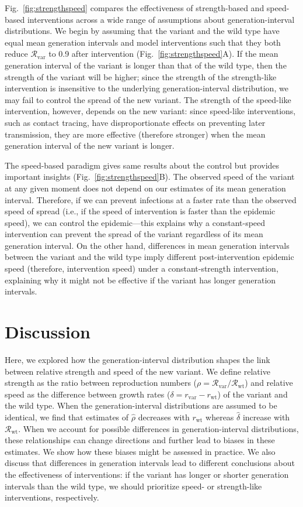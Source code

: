 \documentclass[12pt]{article}
\newcommand{\fref}[1]{Fig.~\ref{fig:#1}}
\newcommand{\vvvar}{\mathrm{var}}
\newcommand{\wwwt}{\mathrm{wt}}
\newcommand{\rx}[1]{\ensuremath{{r}_{#1}}\xspace}
\newcommand{\rw}{\rx{\wwwt}}
\newcommand{\rv}{\rx{\vvvar}}
\newcommand{\Rx}[1]{\ensuremath{{\mathcal R}_{#1}}\xspace}
\newcommand{\Rw}{\Rx{\wwwt}}
\newcommand{\Rv}{\Rx{\vvvar}}
\begin{document}
\fref{strengthspeed} compares the effectiveness of strength-based and speed-based interventions across a wide range of assumptions about generation-interval distributions.
We begin by assuming that the variant and the wild type have equal mean generation intervals and model interventions such that they both reduce $\Rv$ to 0.9 after intervention (\fref{strengthspeed}A).
If the mean generation interval of the variant is longer than that of the wild type, then the strength of the variant will be higher;
since the strength of the strength-like intervention is insensitive to the underlying generation-interval distribution, we may fail to control the spread of the new variant.
The strength of the speed-like intervention, however, depends on the new variant:
since speed-like interventions, such as contact tracing, have disproportionate effects on preventing later transmission, they are more effective (therefore stronger) when the mean generation interval of the new variant is longer.

The speed-based paradigm gives same results about the control but provides important insights (\fref{strengthspeed}B).
The observed speed of the variant at any given moment does not depend on our estimates of its mean generation interval.
Therefore, if we can prevent infections at a faster rate than the observed speed of spread (i.e., if the speed of intervention is faster than the epidemic speed), we can control the epidemic---this explains why a constant-speed intervention can prevent the spread of the variant regardless of its mean generation interval.
On the other hand, differences in mean generation intervals between the variant and the wild type imply different post-intervention epidemic speed (therefore, intervention speed) under a constant-strength intervention, explaining why it might not be effective if the variant has longer generation intervals.

\section{Discussion}

Here, we explored how the generation-interval distribution shapes the link between relative strength and speed of the new variant.
We define relative strength as the ratio between reproduction numbers ($\rho=\Rv/\Rw$) and relative speed as the difference between growth rates ($\delta=\rv-\rw$) of the variant and the wild type.
When the generation-interval distributions are assumed to be identical, we find that estimates of $\hat{\rho}$ decreases with $\rw$ whereas $\hat{\delta}$ increase with $\Rw$.
When we account for possible differences in generation-interval distributions, these relationships can change directions and further lead to biases in these estimates.
We show how these biases might be assessed in practice.
We also discuss that differences in generation intervals lead to different conclusions about the effectiveness of interventions:
if the variant has longer or shorter generation intervals than the wild type, we should prioritize speed- or strength-like interventions, respectively.
\end{document}
